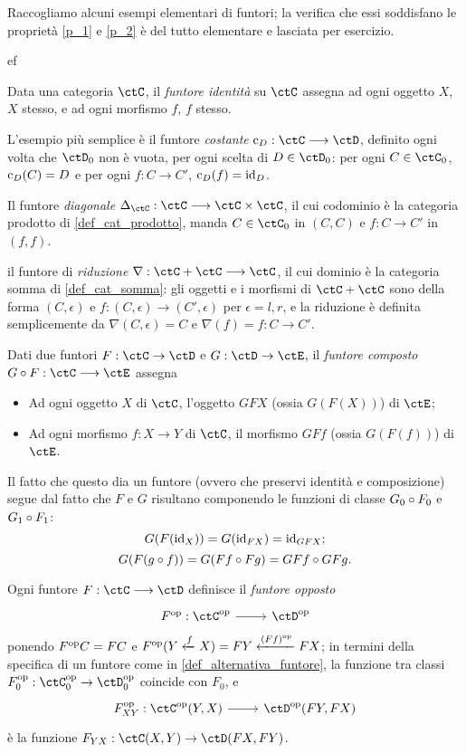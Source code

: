 \begin{examples}\label{es_di_funtori}
	Raccogliamo alcuni esempi elementari di funtori; la verifica che essi soddisfano le proprietà \ref{p_1} e \ref{p_2} è del tutto elementare e lasciata per esercizio.
	\begin{enumtag}{ef}
		\item \label{exfun_1} Data una categoria \(\ctC\), il \emph{funtore identità} su \(\ctC\) assegna ad ogni oggetto \(X\), \(X\) stesso, e ad ogni morfismo \(f\), \(f\) stesso.
		\item \label{exfun_2} L'esempio più semplice è il funtore \emph{costante} \(\const_D : \ctC\fun\ctD\), definito ogni volta che \(\ctD_0\) non è vuota, per ogni scelta di \(D\in\ctD_0\): per ogni \(C\in\ctC_0\), \(\text{c}_D(C)=D\) e per ogni \(f : C\to C'\), \(\text{c}_D(f)=\mathrm{id}_D\).
		\item \label{exfun_3} Il funtore \emph{diagonale} \(\Delta_\ctC : \ctC \fun\ctC\times\ctC\), il cui codominio è la categoria prodotto di \ref{def_cat_prodotto}, manda \(C\in\ctC_0\) in \((C,C)\) e \(f : C\to C'\) in \((f,f)\).
		\item {}\label{exfun_4} il funtore di \emph{riduzione} \(\nabla : \ctC+\ctC \fun\ctC\), il cui dominio è la categoria somma di \ref{def_cat_somma}: gli oggetti e i morfismi di \(\ctC+\ctC\) sono della forma \((C,\epsilon)\) e \(f : (C,\epsilon) \to (C',\epsilon)\) per \(\epsilon=l,r\), e la riduzione è definita semplicemente da \(\nabla(C,\epsilon)=C\) e \(\nabla(f)=f : C\to C'\).
		\item \label{exfun_5} Dati due funtori \(F:\ctC\to\ctD\) e \(G:\ctD\to\ctE\), il \emph{funtore composto} \(G\cmp F:\ctC\fun\ctE\) assegna
		\begin{itemize}
			\item Ad ogni oggetto \(X\) di \(\ctC\), l'oggetto \(GFX\) (ossia \(G(F(X))\)) di \(\ctE\);
			\item Ad ogni morfismo \(f:X\to Y\) di \(\ctC\), il morfismo \(GFf\) (ossia \(G(F(f))\)) di \(\ctE\).
		\end{itemize}
		Il fatto che questo dia un funtore (ovvero che preservi identità e composizione) segue dal fatto che \(F\) e \(G\) risultano componendo le funzioni di classe \(G_0\circ F_0\) e \(G_1\circ F_1\):
		\[
			G(F(\mathrm{id}_X)) = G(\mathrm{id}_{FX}) = \mathrm{id}_{GFX} ;
		\]
		\[
			G(F(g\circ f)) = G(Ff\circ Fg) = GFf\circ GFg .
		\]
		\item Ogni funtore \(F : \ctC\fun\ctD\) definisce il \emph{funtore opposto}
		\[\dmFun{F^\op}{\ctC^\op}{\ctD^\op}\]
		ponendo \(F^{\text{op}} C=FC\) e \(F^{\text{op}}(Y \xleftarrow{f} X) = FY \xleftarrow{(Ff)^{\text{op}}} FX\); in termini della specifica di un funtore come in \ref{def_alternativa_funtore}, la funzione tra classi \(F^\op_0 : \ctC^\op_0\to\ctD^\op_0\) coincide con \(F_0\), e
		\[\dmFun{F_{XY}^\op}{\Hom{\ctC^\op}(Y,X)}{\Hom{\ctD^\op}(FY,FX)}\]
		è la funzione \(F_{YX} : \Hom{\ctC}(X,Y)\to \Hom{\ctD}(FX,FY)\).
	\end{enumtag}
\end{examples}
